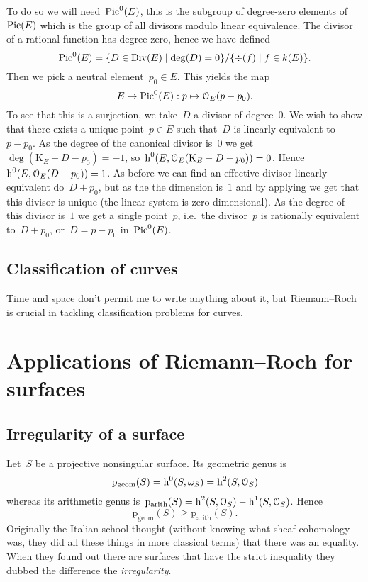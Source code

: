 To do so we will need~$\operatorname{Pic}^0(E)$, this is the subgroup of degree-zero elements of~$\operatorname{Pic}(E)$ which is the group of all divisors modulo linear equivalence. The divisor of a rational function has degree zero, hence we have defined
\begin{equation}
  \operatorname{Pic}^0(E)=\{D\in\operatorname{Div}(E)\mid\deg(D)=0\}/\{\div(f)\mid f\in k(E)\}.
\end{equation}
Then we pick a neutral element~$p_0\in E$. This yields the map
\begin{equation}
  E\mapsto\operatorname{Pic}^0(E):p\mapsto\mathcal{O}_E(p-p_0).
\end{equation}
To see that this is a surjection, we take~$D$ a divisor of degree~$0$. We wish to show that there exists a unique point~$p\in E$ such that~$D$ is linearly equivalent to~$p-p_0$. As the degree of the canonical divisor is~$0$ we get~$\deg(\mathrm{K}_E-D-p_0)=-1$, so~$\operatorname{h}^0(E,\mathcal{O}_E(\mathrm{K}_E-D-p_0))=0$. Hence~$\operatorname{h}^0(E,\mathcal{O}_E(D+p_0))=1$. As before we can find an effective divisor linearly equivalent do~$D+p_0$, but as the the dimension is~$1$ and by applying \cite[proposition II.7.7]{hartshorne-algebraic-geometry} we get that this divisor is unique (the linear system is zero-dimensional). As the degree of this divisor is~$1$ we get a single point~$p$, i.e.\ the divisor~$p$ is rationally equivalent to~$D+p_0$, or~$D=p-p_0$ in~$\operatorname{Pic}^0(E)$.

\subsection{Classification of curves}
Time and space don't permit me to write anything about it, but Riemann--Roch is crucial in tackling classification problems for curves.


\section{Applications of Riemann--Roch for surfaces}
\label{section:applications-surfaces}
\subsection{Irregularity of a surface}
Let~$S$ be a projective nonsingular surface. Its geometric genus is
\begin{equation}
  \mathrm{p}_{\mathrm{geom}}(S)=\operatorname{h}^0(S,\omega_S)=\operatorname{h}^2(S,\mathcal{O}_S) 
\end{equation}
whereas its arithmetic genus is~$\mathrm{p}_{\mathrm{arith}}(S)=\operatorname{h}^2(S,\mathcal{O}_S)-\operatorname{h}^1(S,\mathcal{O}_S)$. Hence
\begin{equation}
  \mathrm{p}_{\mathrm{geom}}(S)\geq\mathrm{p}_{\mathrm{arith}}(S) .
\end{equation}
Originally the Italian school thought (without knowing what sheaf cohomology was, they did all these things in more classical terms) that there was an equality. When they found out there are surfaces that have the strict inequality they dubbed the difference the \emph{irregularity}.

